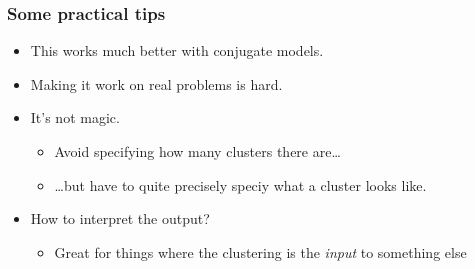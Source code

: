 \begin{frame}
	\frametitle{Some practical tips}
	\begin{itemize}
		\item This works much better with conjugate models.
		\item Making it work on real problems is hard.
		\item It's not magic.
		\begin{itemize}
			\item Avoid specifying how many clusters there are\ldots
			\item \ldots but have to quite precisely speciy what a cluster looks like.
		\end{itemize}
		\item How to interpret the output?
		\begin{itemize}
			\item Great for things where the clustering is the \emph{input} to something else
		\end{itemize}
	\end{itemize}
\end{frame}
